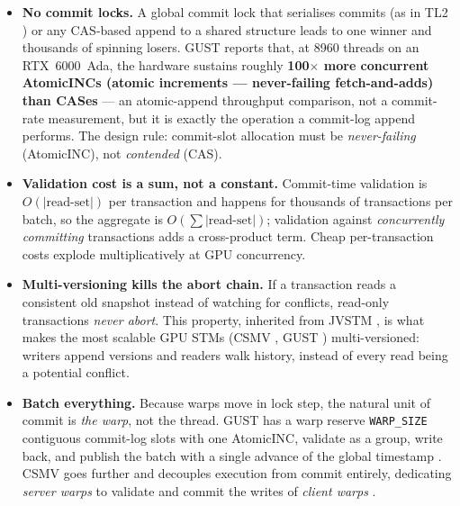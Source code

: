 \begin{itemize}
    \item \textbf{No commit locks.} A global commit lock that serialises
          commits (as in TL2 \cite{dice06tl2}) or any CAS-based append to a
          shared structure leads to one winner and thousands of spinning
          losers. GUST reports that, at 8960 threads on an RTX~6000~Ada,
          the hardware sustains roughly \textbf{100$\times$ more concurrent
          AtomicINCs (atomic increments --- never-failing fetch-and-adds) than CASes} \cite{nunes23gust} --- an atomic-append
          throughput comparison, not a commit-rate measurement, but it is
          exactly the operation a commit-log append performs. The design
          rule: commit-slot allocation must be \emph{never-failing}
          (AtomicINC), not \emph{contended} (CAS).
    \item \textbf{Validation cost is a sum, not a constant.} Commit-time
          validation is $O(|\text{read-set}|)$ per transaction and happens for
          thousands of transactions per batch, so the aggregate is
          $O(\sum |\text{read-set}|)$; validation against \emph{concurrently
          committing} transactions adds a cross-product term. Cheap
          per-transaction costs explode multiplicatively at GPU concurrency.
    \item \textbf{Multi-versioning kills the abort chain.} If a transaction
          reads a consistent old snapshot instead of watching for conflicts,
          read-only transactions \emph{never abort}. This property, inherited
          from JVSTM \cite{cachopo06}, is what makes the most scalable GPU
          STMs (CSMV \cite{nunes22csmv}, GUST \cite{nunes23gust})
          multi-versioned: writers append versions and readers walk history,
          instead of every read being a potential conflict.
    \item \textbf{Batch everything.} Because warps move in lock step, the
          natural unit of commit is \emph{the warp}, not the thread. GUST has
          a warp reserve \texttt{WARP\_SIZE} contiguous commit-log slots with
          one AtomicINC, validate as a group, write back, and publish the
          batch with a single advance of the global timestamp
          \cite{nunes23gust}. CSMV goes further and decouples execution from
          commit entirely, dedicating \emph{server warps} to validate and
          commit the writes of \emph{client warps} \cite{nunes22csmv}.
\end{itemize}

